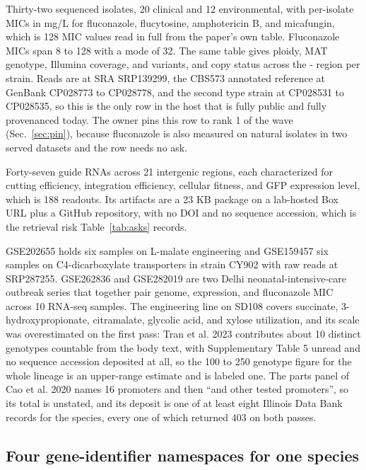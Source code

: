  Thirty-two sequenced isolates, 20
clinical and 12 environmental, with per-isolate MICs in mg/L for fluconazole, flucytosine,
amphotericin B, and micafungin, which is 128 MIC values read in full from the paper's own
table. Fluconazole MICs span 8 to 128 with a mode of 32. The same table gives ploidy, MAT
genotype, Illumina coverage,  and  variants, and copy status across the
- region per strain. Reads are at SRA SRP139299, the CBS573 annotated
reference at GenBank CP028773 to CP028778, and the second type strain at CP028531 to CP028535,
so this is the only row in the host that is fully public and fully provenanced today.
The owner pins this row to rank 1 of the wave (Sec.~\ref{sec:pin}), because fluconazole is
also measured on  natural isolates in two served datasets and the row
needs no ask.

 Forty-seven guide RNAs
across 21 intergenic regions, each characterized for cutting efficiency, integration
efficiency, cellular fitness, and GFP expression level, which is 188 readouts. Its artifacts
are a 23 KB package on a lab-hosted Box URL plus a GitHub repository, with no DOI and no
sequence accession, which is the retrieval risk Table~\ref{tab:asks} records.

 GSE202655 holds six samples on L-malate
engineering and GSE159457 six samples on C4-dicarboxylate transporters in strain CY902 with raw
reads at SRP287255. GSE262836 and GSE282019 are two Delhi neonatal-intensive-care outbreak
series that together pair genome, expression, and fluconazole MIC across 10 RNA-seq samples.
The engineering line on SD108 covers succinate, 3-hydroxypropionate, citramalate,
glycolic acid, and xylose utilization, and its scale was overestimated on the first pass: Tran
et al. 2023 contributes about 10 distinct genotypes countable from the body text, with
Supplementary Table 5 unread and no sequence accession deposited at all, so the 100 to 250
genotype figure for the whole lineage is an upper-range estimate and is labeled one. The parts
panel of Cao et al. 2020 names 16 promoters and then ``and other tested promoters'', so its
total is unstated, and its deposit is one of at least eight Illinois Data Bank records for the
species, every one of which returned 403 on both passes.

\subsection{Four gene-identifier namespaces for one species}\label{sec:pk-ids}

